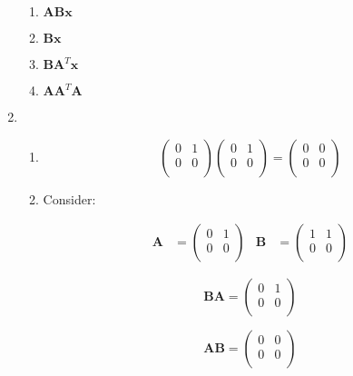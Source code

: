 \documentclass[10pt,oneside,a4paper]{article}
\begin{document}
\begin{enumerate}
\begin{enumerate}

\item $\mathbf{ABx}$

\item $\mathbf{Bx}$

\item $\mathbf{B}\mathbf{A}^T\mathbf{x}$

\item $\mathbf{A}\mathbf{A}^T\mathbf{A}$

\end{enumerate}

\item 

\begin{enumerate}

\item 

\[
\begin{pmatrix} 0 & 1 \\ 0 & 0 \\ \end{pmatrix} \begin{pmatrix} 0 & 1 \\ 0 & 0 \\ \end{pmatrix} = \begin{pmatrix} 0 & 0 \\ 0 & 0 \\ \end{pmatrix}
\]

\item 

Consider:

\begin{align*}
\mathbf{A} &= \begin{pmatrix} 0 & 1 \\ 0 & 0 \\ \end{pmatrix} & \mathbf{B} &= \begin{pmatrix} 1 & 1 \\ 0 & 0 \\ \end{pmatrix}
\end{align*}

\[
\mathbf{BA} = \begin{pmatrix} 0 & 1 \\ 0 & 0 \\ \end{pmatrix}
\]

\[
\mathbf{AB} = \begin{pmatrix} 0 & 0 \\ 0 & 0 \\ \end{pmatrix}
\]


\end{enumerate}
\end{enumerate}
\end{document}
